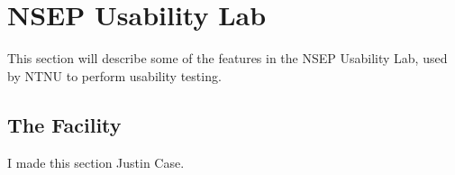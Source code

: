 \section{NSEP Usability Lab}
\label{nseplab}

This section will describe some of the features in the NSEP Usability Lab, used by NTNU to perform usability testing. 

\subsection{The Facility}
I made this section Justin Case.